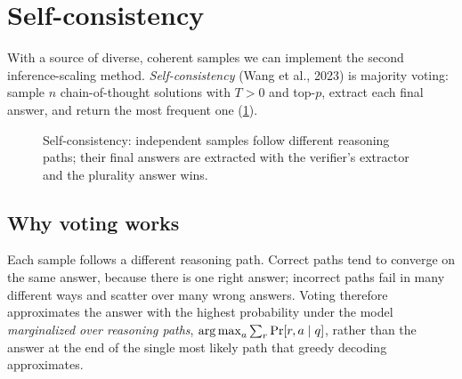\section{Self-consistency}\label{sec:scaling:sc}


With a source of diverse, coherent samples we can implement the second inference-scaling method.
\emph{Self-consistency} (Wang et al., 2023) is majority voting: sample $n$ chain-of-thought
solutions with $T > 0$ and top-$p$, extract each final answer, and return the most frequent one
(\cref{fig:scaling:vote}).

\begin{figure}[t]
\centering
{}
\caption{Self-consistency: independent samples follow different reasoning paths; their final
answers are extracted with the verifier's extractor and the plurality answer wins.}
\label{fig:scaling:vote}
\end{figure}

\subsection{Why voting works}
Each sample follows a different reasoning path. Correct paths tend to converge on the same answer,
because there is one right answer; incorrect paths fail in many different ways and scatter over
many wrong answers. Voting therefore approximates the answer with the highest probability under the
model \emph{marginalized over reasoning paths}, $\operatorname*{arg\,max}_a \sum_{r} \Pr[r, a \mid q]$, rather than
the answer at the end of the single most likely path that greedy decoding approximates.


